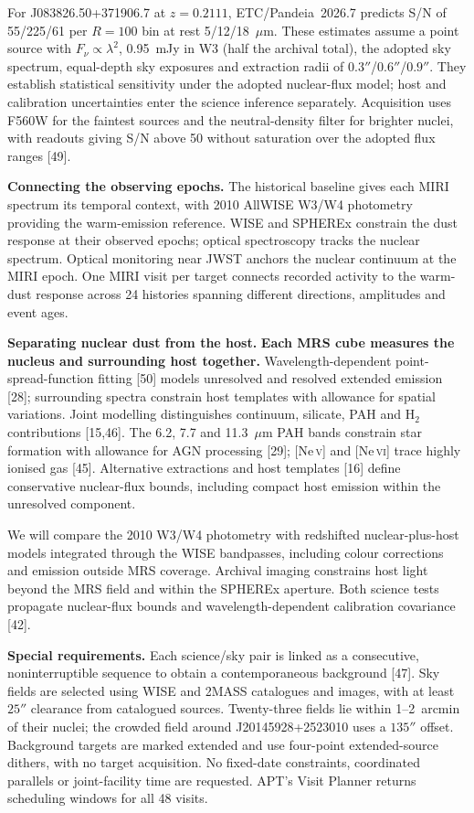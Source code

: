 \documentclass[12pt]{article}
\begin{document}
For J083826.50+371906.7 at $z=0.2111$, ETC/Pandeia~2026.7 predicts S/N of 55/225/61 per $R=100$ bin at rest 5/12/18~$\mu$m. These estimates assume a point source with $F_\nu\propto\lambda^2$, 0.95~mJy in W3 (half the archival total), the adopted sky spectrum, equal-depth sky exposures and extraction radii of $0.3''$/$0.6''$/$0.9''$. They establish statistical sensitivity under the adopted nuclear-flux model; host and calibration uncertainties enter the science inference separately. Acquisition uses F560W for the faintest sources and the neutral-density filter for brighter nuclei, with readouts giving S/N above 50 without saturation over the adopted flux ranges [49].

\noindent\textbf{Connecting the observing epochs.}
The historical baseline gives each MIRI spectrum its temporal context, with 2010 AllWISE W3/W4 photometry providing the warm-emission reference. WISE and SPHEREx constrain the dust response at their observed epochs; optical spectroscopy tracks the nuclear spectrum. Optical monitoring near JWST anchors the nuclear continuum at the MIRI epoch. One MIRI visit per target connects recorded activity to the warm-dust response across 24 histories spanning different directions, amplitudes and event ages.

\noindent\textbf{Separating nuclear dust from the host.}
\textbf{Each MRS cube measures the nucleus and surrounding host together.} Wavelength-dependent point-spread-function fitting [50] models unresolved and resolved extended emission [28]; surrounding spectra constrain host templates with allowance for spatial variations. Joint modelling distinguishes continuum, silicate, PAH and H$_2$ contributions [15,46]. The 6.2, 7.7 and 11.3~$\mu$m PAH bands constrain star formation with allowance for AGN processing [29]; [Ne\,\textsc{v}] and [Ne\,\textsc{vi}] trace highly ionised gas [45]. Alternative extractions and host templates [16] define conservative nuclear-flux bounds, including compact host emission within the unresolved component.

We will compare the 2010 W3/W4 photometry with redshifted nuclear-plus-host models integrated through the WISE bandpasses, including colour corrections and emission outside MRS coverage. Archival imaging constrains host light beyond the MRS field and within the SPHEREx aperture. Both science tests propagate nuclear-flux bounds and wavelength-dependent calibration covariance [42].

\clearpage
\supplementalinformation
\noindent\textbf{Special requirements.} Each science/sky pair is linked as a consecutive, noninterruptible sequence to obtain a contemporaneous background [47]. Sky fields are selected using WISE and 2MASS catalogues and images, with at least $25''$ clearance from catalogued sources. Twenty-three fields lie within 1--2~arcmin of their nuclei; the crowded field around J20145928+2523010 uses a $135''$ offset. Background targets are marked extended and use four-point extended-source dithers, with no target acquisition. No fixed-date constraints, coordinated parallels or joint-facility time are requested. APT's Visit Planner returns scheduling windows for all 48 visits.
\end{document}
